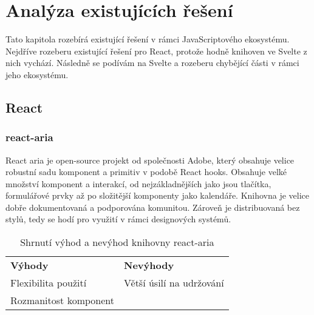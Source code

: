 \chapter{Analýza existujících řešení}

Tato kapitola rozebírá existující řešení v rámci JavaScriptového ekosystému.
Nejdříve rozeberu existující řešení pro React, protože hodně knihoven ve Svelte z nich vychází.
Následně se podívám na Svelte a rozeberu chybějící části v rámci jeho ekosystému.

\section{React}

\subsection{react-aria}

React aria je open-source projekt od společnosti Adobe, který obsahuje velice robustní sadu komponent a primitiv v podobě React hooks.
Obsahuje velké množství komponent a interakcí, od nejzákladnějších jako jsou tlačítka, formulářové prvky až po složitější komponenty jako kalendáře.
Knihovna je velice dobře dokumentovaná a podporována komunitou.
Zároveň je distribuovaná bez stylů, tedy se hodí pro využití v rámci designových systémů.

\begin{table}[ht]
    \begin{ctucolortab}
        \begin{tabularx}{\textwidth}{Y Y}
            \bfseries \textcolor{OK}{Výhody} & \bfseries \textcolor{NOT_OK}{Nevýhody} \\\Midrule{}
            Flexibilita použití              & Větší úsilí na udržování               \\
            Rozmanitost komponent
        \end{tabularx}
    \end{ctucolortab}
    \caption{Shrnutí výhod a nevýhod knihovny react-aria}
\end{table}




